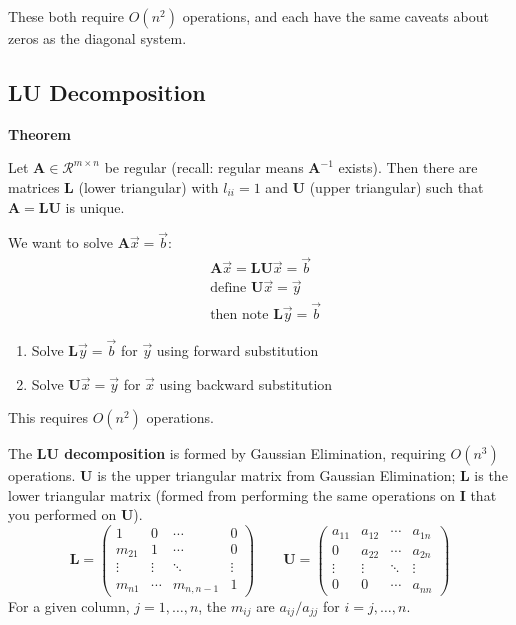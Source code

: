\documentclass[12pt]{article}
\newcommand{\ve}[1]{\ensuremath{\mathbf{#1}}}
\begin{document}
These both require $O(n^2)$ operations, and each have the same caveats about zeros as the diagonal system.

\subsection*{LU Decomposition}

\textbf{Theorem}

Let $\ve{A} \in \mathcal{R}^{m \times n}$ be regular (recall: regular means $\ve{A}^{-1}$ exists). Then there are matrices $\ve{L}$ (lower triangular) with $l_{ii} = 1$ and $\ve{U}$ (upper triangular) such that $\ve{A} = \ve{L}\ve{U}$ is unique.

We want to solve $\ve{A}\vec{x} = \vec{b}$:
%
\begin{align}
&\ve{A}\vec{x} = \ve{L}\ve{U}\vec{x} = \vec{b} \nonumber \\
%
&\text{define } \ve{U}\vec{x} = \vec{y} \nonumber \\
%
&\text{then note }\ve{L}\vec{y} = \vec{b} \nonumber
\end{align}
%
\begin{enumerate}
\item Solve $\ve{L}\vec{y} = \vec{b}$ for $\vec{y}$ using forward substitution
\item Solve $\ve{U}\vec{x} = \vec{y}$ for $\vec{x}$ using backward substitution
\end{enumerate}
%
This requires $O(n^2)$ operations.

The \textbf{LU decomposition} is formed by Gaussian Elimination, requiring $O(n^3)$ operations. $\ve{U}$ is the upper triangular matrix from Gaussian Elimination; $\ve{L}$ is the lower triangular matrix (formed from performing the same operations on $\ve{I}$ that you performed on $\ve{U}$). 
%
\begin{equation}
   \ve{L} = \begin{pmatrix}
      1      & 0      & \cdots    & 0 \\
      m_{21} & 1      & \cdots    & 0 \\
      \vdots & \vdots & \ddots    & \vdots \\     
      m_{n1} & \cdots & m_{n,n-1} & 1 
    \end{pmatrix} \qquad
  \ve{U} = \begin{pmatrix}
      a_{11} & a_{12} & \cdots & a_{1n} \\
      0      & a_{22} & \cdots & a_{2n} \\
      \vdots & \vdots & \ddots & \vdots \\     
      0      & 0      & \cdots &  a_{nn} 
    \end{pmatrix}
    \nonumber   
\end{equation} 
%
For a given column, $j = 1, \dots, n$, the $m_{ij}$ are $a_{ij} / a_{jj}$ for $i = j, \dots, n$. 
\end{document}
